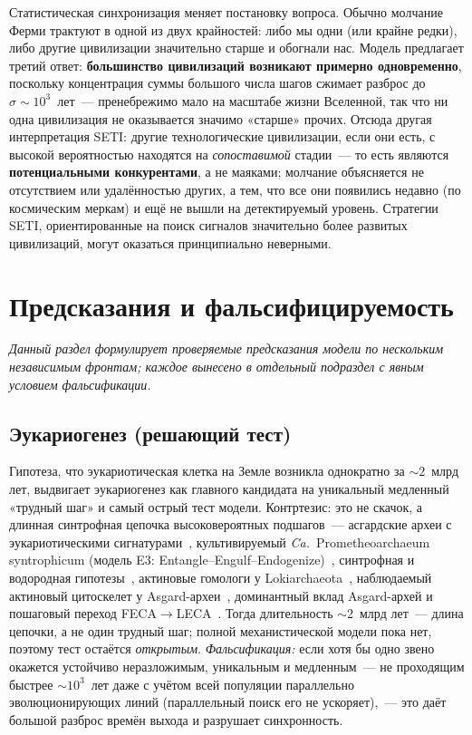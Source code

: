 \documentclass[12pt,a4paper]{article}
\begin{document}
Статистическая синхронизация меняет постановку вопроса. Обычно молчание Ферми трактуют в одной из двух крайностей: либо мы одни (или крайне редки), либо другие цивилизации значительно старше и обогнали нас. Модель предлагает третий ответ: \textbf{большинство цивилизаций возникают примерно одновременно}, поскольку концентрация суммы большого числа шагов сжимает разброс до $\sigma \sim 10^3$~лет~--- пренебрежимо мало на масштабе жизни Вселенной, так что ни одна цивилизация не оказывается значимо «старше» прочих. Отсюда другая интерпретация SETI: другие технологические цивилизации, если они есть, с высокой вероятностью находятся на \emph{сопоставимой} стадии~--- то есть являются \textbf{потенциальными конкурентами}, а не маяками; молчание объясняется не отсутствием или удалённостью других, а тем, что все они появились недавно (по космическим меркам) и ещё не вышли на детектируемый уровень. Стратегии SETI, ориентированные на поиск сигналов значительно более развитых цивилизаций, могут оказаться принципиально неверными.

\section{Предсказания и фальсифицируемость}
\label{sec:predictions}

\textit{Данный раздел формулирует проверяемые предсказания модели по нескольким независимым фронтам; каждое вынесено в отдельный подраздел с явным условием фальсификации.}

\subsection{Эукариогенез (решающий тест)}
\label{sec:eukaryo}

Гипотеза, что эукариотическая клетка на Земле возникла однократно за $\sim 2$~млрд лет, выдвигает эукариогенез как главного кандидата на уникальный медленный «трудный шаг» и самый острый тест модели. Контртезис: это не скачок, а длинная синтрофная цепочка высоковероятных подшагов~--- асгардские археи с эукариотическими сигнатурами~\cite{Spang2015,Zaremba2017}, культивируемый \emph{Ca.}~Prometheoarchaeum syntrophicum (модель E3: Entangle--Engulf--Endogenize)~\cite{Imachi2020}, синтрофная и водородная гипотезы~\cite{LopezGarcia2020,Martin1998}, актиновые гомологи у Lokiarchaeota~\cite{Spang2015}, наблюдаемый актиновый цитоскелет у Asgard-археи~\cite{Rodrigues2023}, доминантный вклад Asgard-архей и пошаговый переход FECA$\to$LECA~\cite{Tobiasson2026,Speijer2025,BravoArevalo2025}. Тогда длительность $\sim 2$~млрд лет~--- длина цепочки, а не один трудный шаг; полной механистической модели пока нет, поэтому тест остаётся \emph{открытым}. \emph{Фальсификация:} если хотя бы одно звено окажется устойчиво неразложимым, уникальным и медленным~--- не проходящим быстрее $\sim 10^3$~лет даже с учётом всей популяции параллельно эволюционирующих линий (параллельный поиск его не ускоряет),~--- это даёт большой разброс времён выхода и разрушает синхронность.
\end{document}
